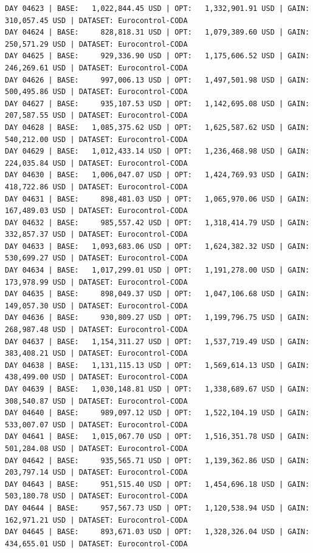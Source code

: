 \documentclass[11pt,a4paper]{article}
\begin{document}
\begin{verbatim}
DAY 04623 | BASE:   1,022,844.45 USD | OPT:   1,332,901.91 USD | GAIN: 310,057.45 USD | DATASET: Eurocontrol-CODA
DAY 04624 | BASE:     828,818.31 USD | OPT:   1,079,389.60 USD | GAIN: 250,571.29 USD | DATASET: Eurocontrol-CODA
DAY 04625 | BASE:     929,336.90 USD | OPT:   1,175,606.52 USD | GAIN: 246,269.61 USD | DATASET: Eurocontrol-CODA
DAY 04626 | BASE:     997,006.13 USD | OPT:   1,497,501.98 USD | GAIN: 500,495.86 USD | DATASET: Eurocontrol-CODA
DAY 04627 | BASE:     935,107.53 USD | OPT:   1,142,695.08 USD | GAIN: 207,587.55 USD | DATASET: Eurocontrol-CODA
DAY 04628 | BASE:   1,085,375.62 USD | OPT:   1,625,587.62 USD | GAIN: 540,212.00 USD | DATASET: Eurocontrol-CODA
DAY 04629 | BASE:   1,012,433.14 USD | OPT:   1,236,468.98 USD | GAIN: 224,035.84 USD | DATASET: Eurocontrol-CODA
DAY 04630 | BASE:   1,006,047.07 USD | OPT:   1,424,769.93 USD | GAIN: 418,722.86 USD | DATASET: Eurocontrol-CODA
DAY 04631 | BASE:     898,481.03 USD | OPT:   1,065,970.06 USD | GAIN: 167,489.03 USD | DATASET: Eurocontrol-CODA
DAY 04632 | BASE:     985,557.42 USD | OPT:   1,318,414.79 USD | GAIN: 332,857.37 USD | DATASET: Eurocontrol-CODA
DAY 04633 | BASE:   1,093,683.06 USD | OPT:   1,624,382.32 USD | GAIN: 530,699.27 USD | DATASET: Eurocontrol-CODA
DAY 04634 | BASE:   1,017,299.01 USD | OPT:   1,191,278.00 USD | GAIN: 173,978.99 USD | DATASET: Eurocontrol-CODA
DAY 04635 | BASE:     898,049.37 USD | OPT:   1,047,106.68 USD | GAIN: 149,057.30 USD | DATASET: Eurocontrol-CODA
DAY 04636 | BASE:     930,809.27 USD | OPT:   1,199,796.75 USD | GAIN: 268,987.48 USD | DATASET: Eurocontrol-CODA
DAY 04637 | BASE:   1,154,311.27 USD | OPT:   1,537,719.49 USD | GAIN: 383,408.21 USD | DATASET: Eurocontrol-CODA
DAY 04638 | BASE:   1,131,115.13 USD | OPT:   1,569,614.13 USD | GAIN: 438,499.00 USD | DATASET: Eurocontrol-CODA
DAY 04639 | BASE:   1,030,148.81 USD | OPT:   1,338,689.67 USD | GAIN: 308,540.87 USD | DATASET: Eurocontrol-CODA
DAY 04640 | BASE:     989,097.12 USD | OPT:   1,522,104.19 USD | GAIN: 533,007.07 USD | DATASET: Eurocontrol-CODA
DAY 04641 | BASE:   1,015,067.70 USD | OPT:   1,516,351.78 USD | GAIN: 501,284.08 USD | DATASET: Eurocontrol-CODA
DAY 04642 | BASE:     935,565.71 USD | OPT:   1,139,362.86 USD | GAIN: 203,797.14 USD | DATASET: Eurocontrol-CODA
DAY 04643 | BASE:     951,515.40 USD | OPT:   1,454,696.18 USD | GAIN: 503,180.78 USD | DATASET: Eurocontrol-CODA
DAY 04644 | BASE:     957,567.73 USD | OPT:   1,120,538.94 USD | GAIN: 162,971.21 USD | DATASET: Eurocontrol-CODA
DAY 04645 | BASE:     893,671.03 USD | OPT:   1,328,326.04 USD | GAIN: 434,655.01 USD | DATASET: Eurocontrol-CODA

\end{verbatim}
\end{document}
